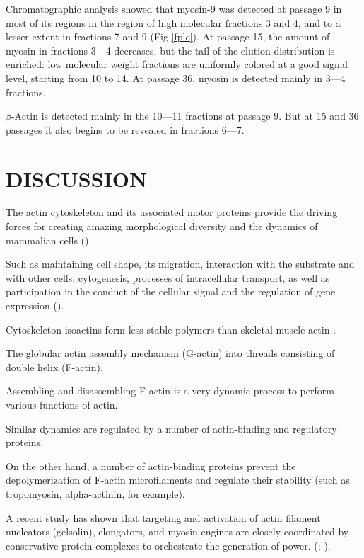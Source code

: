 \documentclass[english,authoryear]{elsarticle}
\begin{document}
Chromatographic analysis showed that myosin-9 was detected at passage 9 in most of its regions in the region of high molecular fractions 3 and 4, and to a lesser extent in fractions 7 and 9 (Fig \ref{fplc}).
At passage 15, the amount of myosin in fractions 3–--4 decreases, but the tail of the elution distribution is enriched: low molecular weight fractions are uniformly colored at a good signal level, starting from 10 to 14.
At passage 36, myosin is detected mainly in 3---4 fractions.

$\beta$-Actin is detected mainly in the 10---11 fractions at passage 9.
But at 15 and 36 passages it also begins to be revealed in fractions 6---7.

\section{DISCUSSION}

The actin cytoskeleton and its associated motor proteins provide the driving forces for creating amazing morphological diversity and the dynamics of mammalian cells (\cite{vasiliev1991polarization}).

Such as maintaining cell shape, its migration, interaction with the substrate and with other cells, cytogenesis, processes of intracellular transport, as well as participation in the conduct of the cellular signal and the regulation of gene expression (\cite{omelchenko2002mechanisms}).

Cytoskeleton isoactins form less stable polymers than skeletal muscle actin \cite{khaitlina2001functional}.

The globular actin assembly mechanism (G-actin) into threads consisting of double helix (F-actin).

Assembling and disassembling F-actin is a very dynamic process to perform various functions of actin.

Similar dynamics are regulated by a number of actin-binding and regulatory proteins.

On the other hand, a number of actin-binding proteins prevent the depolymerization of F-actin microfilaments and regulate their stability (such as tropomyosin, alpha-actinin, for example).

A recent study has shown that targeting and activation of actin filament nucleators (gelsolin), elongators, and myosin engines are closely coordinated by conservative protein complexes to orchestrate the generation of power. (\cite{pantaloni1993profilin}; \cite{sept2001thermodynamics}).
\end{document}
